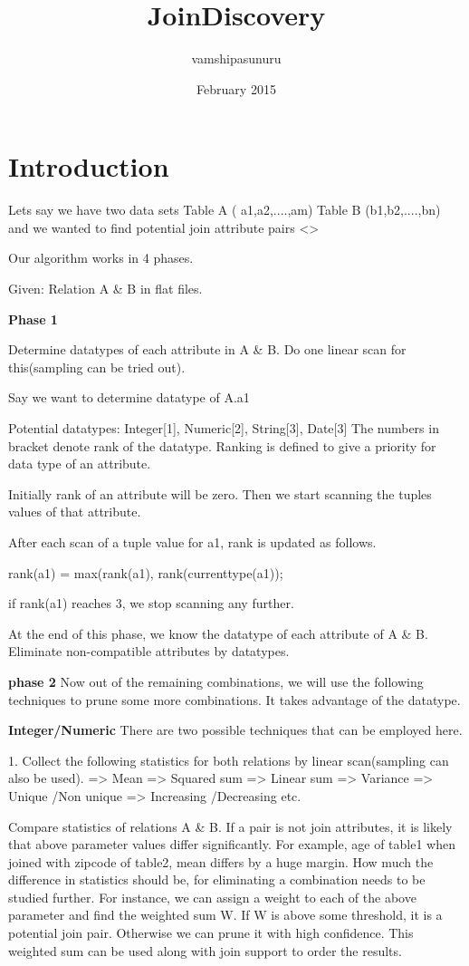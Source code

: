 \documentclass{article}
\title{JoinDiscovery}
\author{vamshipasunuru }
\date{February 2015}
\begin{document}
\maketitle

\section{Introduction}
Lets say we have two data sets 
Table A ( a1,a2,....,am)
Table B (b1,b2,....,bn)
and we wanted to find potential join attribute pairs <>




Our algorithm works in 4 phases.

Given: Relation A & B in flat files.

\textbf{
Phase 1
}

Determine datatypes of each attribute in A & B. Do one linear scan for this(sampling can be tried out).

Say we want to determine datatype of A.a1

Potential datatypes: Integer[1], Numeric[2], String[3], Date[3]
The numbers in bracket denote rank of the datatype. Ranking is defined to give a priority for data type of an attribute. 

Initially rank of an attribute will be zero. Then we start scanning the tuples values of that attribute. 

After each scan of a tuple value for a1, rank is updated as follows.

rank(a1) = max(rank(a1), rank(currenttype(a1));

if rank(a1) reaches 3, we stop scanning any further.

At the end of this phase, we know the datatype of each attribute of A & B. Eliminate non-compatible attributes by datatypes.

\textbf{phase 2}
Now out of the remaining combinations, we will use the following techniques to prune some more combinations. It takes advantage of the datatype.

\textbf{Integer/Numeric}
There are two possible techniques that can be employed here.

1. Collect the following statistics for both relations by linear scan(sampling can also be used). 
                     => Mean
                     => Squared sum
                     => Linear sum
                     => Variance
                     => Unique /Non unique
                     => Increasing /Decreasing etc.

   Compare statistics of relations A & B. If a pair is not join attributes, it is likely that above parameter values differ significantly. For example, age of table1 when joined with zipcode of table2, mean differs by a huge margin. How much the difference in statistics should be, for eliminating a combination needs to be studied further. For instance, we can assign a weight to each of the above parameter and find the weighted sum W. If W is above some threshold, it is a potential join pair. Otherwise we can prune it with high confidence. This weighted sum can be used along with join support to order the results.
\end{document}
